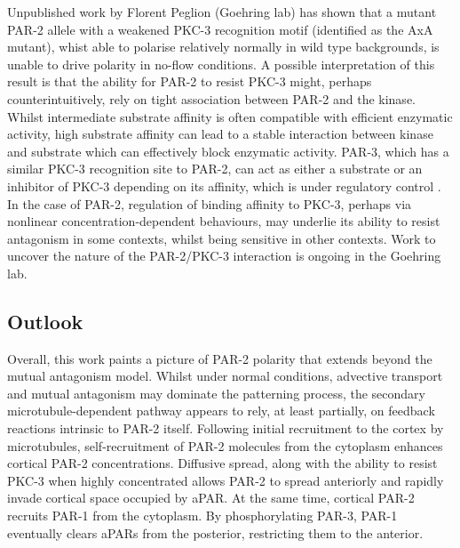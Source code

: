 \documentclass[12pt]{"report"}
\begin{document}
Unpublished work by Florent Peglion (Goehring lab) has shown that a mutant PAR-2 allele with a weakened PKC-3 recognition motif (identified as the AxA mutant), whist able to polarise relatively normally in wild type backgrounds, is unable to drive polarity in no-flow conditions. A possible interpretation of this result is that the ability for PAR-2 to resist PKC-3 might, perhaps counterintuitively, rely on tight association between PAR-2 and the kinase. Whilst intermediate substrate affinity is often compatible with efficient enzymatic activity, high substrate affinity can lead to a stable interaction between kinase and substrate which can effectively block enzymatic activity. PAR-3, which has a similar PKC-3 recognition site to PAR-2, can act as either a substrate or an inhibitor of PKC-3 depending on its affinity, which is under regulatory control \citep{Soriano2016}. In the case of PAR-2, regulation of binding affinity to PKC-3, perhaps via nonlinear concentration-dependent behaviours, may underlie its ability to resist antagonism in some contexts, whilst being sensitive in other contexts. Work to uncover the nature of the PAR-2/PKC-3 interaction is ongoing in the Goehring lab.\\


\subsection{Outlook}

Overall, this work paints a picture of PAR-2 polarity that extends beyond the mutual antagonism model. Whilst under normal conditions, advective transport and mutual antagonism may dominate the patterning process, the secondary microtubule-dependent pathway appears to rely, at least partially, on feedback reactions intrinsic to PAR-2 itself. Following initial recruitment to the cortex by microtubules, self-recruitment of PAR-2 molecules from the cytoplasm enhances cortical PAR-2 concentrations. Diffusive spread, along with the ability to resist PKC-3 when highly concentrated allows PAR-2 to spread anteriorly and rapidly invade cortical space occupied by aPAR. At the same time, cortical PAR-2 recruits PAR-1 from the cytoplasm. By phosphorylating PAR-3, PAR-1 eventually clears aPARs from the posterior, restricting them to the anterior.\\
\end{document}
